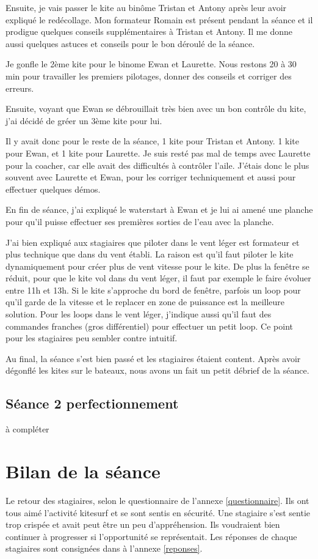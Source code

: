 \documentclass[11pt,a4paper]{report}
\begin{document}
Ensuite, je vais passer le kite au binôme Tristan et Antony après leur
avoir expliqué le redécollage. Mon formateur Romain est présent pendant la
séance et il prodigue quelques conseils supplémentaires à Tristan et Antony.
Il me donne aussi quelques astuces et conseils pour le bon déroulé de la séance.

Je gonfle le 2ème kite pour le binome Ewan et Laurette.
Nous restons 20 à 30 min pour travailler les premiers pilotages,
donner des conseils et corriger des erreurs.

Ensuite, voyant que Ewan se débrouillait très bien avec un bon contrôle du 
kite, j'ai décidé de gréer un 3ème kite pour lui.

Il y avait donc pour le reste de la séance, 1 kite pour Tristan et Antony.
1 kite pour Ewan, et 1 kite pour Laurette. Je suis resté pas mal de temps
avec Laurette pour la coacher, car elle avait des difficultés à contrôler l'aile.
J'étais donc le plus souvent avec Laurette et Ewan, pour les corriger techniquement 
et aussi pour effectuer quelques démos.

En fin de séance, j'ai expliqué le waterstart à Ewan et je lui ai
amené une planche pour qu'il puisse effectuer ses premières sorties
de l'eau avec la planche.

J'ai bien expliqué aux stagiaires que piloter dans le vent léger est
formateur et plus technique que dans du vent établi. La raison est qu'il faut
piloter le kite dynamiquement pour créer plus de vent vitesse pour le kite.
De plus la fen\^etre se réduit, pour que le kite vol dans du vent léger, 
il faut par exemple le faire évoluer entre 11h et 13h. Si le kite s'approche du 
bord de fen\^etre, parfois un loop pour qu'il garde de la vitesse et le replacer
en zone de puissance est la meilleure solution.
Pour les loops dans le vent léger, j'indique aussi qu'il faut
des commandes franches (gros différentiel) pour effectuer un petit loop.
Ce point pour les stagiaires peu sembler contre intuitif.

Au final, la séance s'est bien passé et les stagiaires étaient content.
Après avoir dégonflé les kites sur le bateaux, nous avons un fait un
petit débrief de la séance.

\subsection{Séance 2 perfectionnement}
à compléter
\section{Bilan de la séance}
Le retour des stagiaires, selon le questionnaire de l'annexe \ref{questionnaire}.
Ils ont tous aimé l'activité kitesurf et se sont sentis en sécurité.
Une stagiaire s'est sentie trop crispée et avait peut \^etre un peu d'appréhension.
Ils  voudraient bien continuer à progresser si l'opportunité se représentait.
Les réponses de chaque stagiaires sont consignées dans à l'annexe \ref{reponses}.
\end{document}
